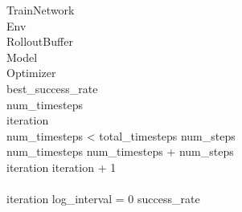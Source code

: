 \renewcommand{\thepseudonum}{\roman{pseudonum}}
\begin{pseudocode}{TrainNetwork}{ }
\label{Train}
\\

\MAIN
Env \GETS {}\\
RolloutBuffer \GETS {}\\
Model \GETS {}\\
Optimizer \GETS {}\\

best\_success\_rate \\
num\_timesteps \\
iteration \\
\WHILE num\_timesteps < total\_timesteps \DO 
\BEGIN 
num\_steps \GETS {}\\
num\_timesteps \GETS num\_timesteps + num\_steps\\
iteration \GETS iteration + 1\\
\\
\IF iteration \mathbin{\%}  log\_interval = 0 \THEN
\BEGIN
success\_rate \GETS {}\\
\\
\END
\END\\
\ENDMAIN
\end{pseudocode}



